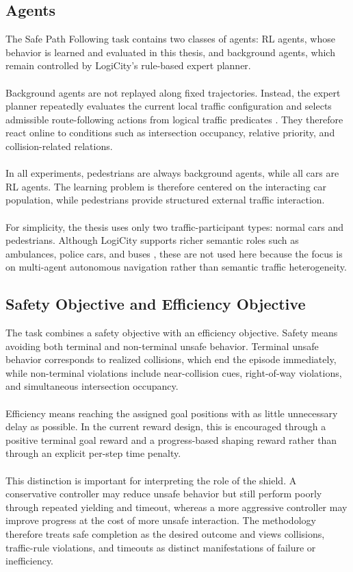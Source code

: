\subsection{Agents}
The Safe Path Following task contains two classes of agents: RL agents, whose behavior is learned and evaluated in this thesis, and background agents, which remain controlled by LogiCity's rule-based expert planner.
\\
\\
Background agents are not replayed along fixed trajectories. Instead, the expert planner repeatedly evaluates the current local traffic configuration and selects admissible route-following actions from logical traffic predicates \cite{li2025logicityadvancingneurosymbolicai}. They therefore react online to conditions such as intersection occupancy, relative priority, and collision-related relations.
\\
\\
In all experiments, pedestrians are always background agents, while all cars are RL agents. The learning problem is therefore centered on the interacting car population, while pedestrians provide structured external traffic interaction.
\\
\\
For simplicity, the thesis uses only two traffic-participant types: normal cars and pedestrians. Although LogiCity supports richer semantic roles such as ambulances, police cars, and buses \cite{li2025logicityadvancingneurosymbolicai}, these are not used here because the focus is on multi-agent autonomous navigation rather than semantic traffic heterogeneity.

\subsection{Safety Objective and Efficiency Objective}
The task combines a safety objective with an efficiency objective. Safety means avoiding both terminal and non-terminal unsafe behavior. Terminal unsafe behavior corresponds to realized collisions, which end the episode immediately, while non-terminal violations include near-collision cues, right-of-way violations, and simultaneous intersection occupancy.
\\
\\
Efficiency means reaching the assigned goal positions with as little unnecessary delay as possible. In the current reward design, this is encouraged through a positive terminal goal reward and a progress-based shaping reward rather than through an explicit per-step time penalty.
\\
\\
This distinction is important for interpreting the role of the shield. A conservative controller may reduce unsafe behavior but still perform poorly through repeated yielding and timeout, whereas a more aggressive controller may improve progress at the cost of more unsafe interaction. The methodology therefore treats safe completion as the desired outcome and views collisions, traffic-rule violations, and timeouts as distinct manifestations of failure or inefficiency.

